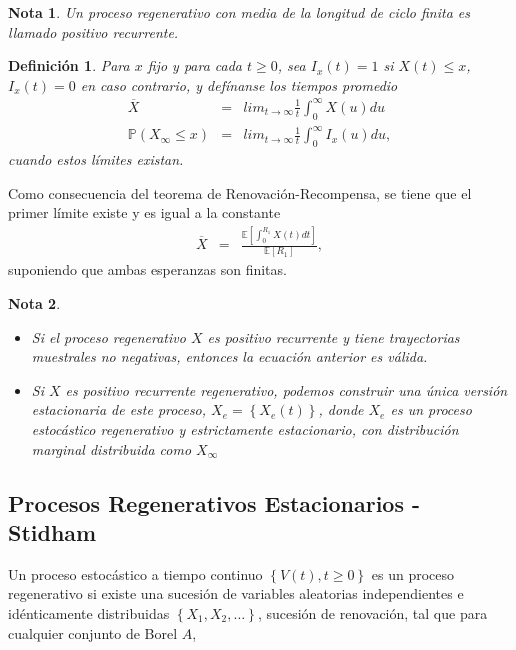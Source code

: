 \documentclass{article}
\newtheorem{Def}{Definición}
\newtheorem{Note}{Nota}
\newcommand{\esp}{\mathbb{E}}
\newcommand{\prob}{\mathbb{P}}
\begin{document}
\begin{Note}
Un proceso regenerativo con media de la longitud de ciclo finita es llamado positivo recurrente.
\end{Note}


\begin{Def}
Para $x$ fijo y para cada $t\geq0$, sea $I_{x}\left(t\right)=1$ si $X\left(t\right)\leq x$,  $I_{x}\left(t\right)=0$ en caso contrario, y def\'inanse los tiempos promedio
\begin{eqnarray*}
\overline{X}&=&lim_{t\rightarrow\infty}\frac{1}{t}\int_{0}^{\infty}X\left(u\right)du\\
\prob\left(X_{\infty}\leq x\right)&=&lim_{t\rightarrow\infty}\frac{1}{t}\int_{0}^{\infty}I_{x}\left(u\right)du,
\end{eqnarray*}
cuando estos l\'imites existan.
\end{Def}

Como consecuencia del teorema de Renovaci\'on-Recompensa, se tiene que el primer l\'imite  existe y es igual a la constante
\begin{eqnarray*}
\overline{X}&=&\frac{\esp\left[\int_{0}^{R_{1}}X\left(t\right)dt\right]}{\esp\left[R_{1}\right]},
\end{eqnarray*}
suponiendo que ambas esperanzas son finitas.

\begin{Note}
\begin{itemize}
\item[a)] Si el proceso regenerativo $X$ es positivo recurrente y tiene trayectorias muestrales no negativas, entonces la ecuaci\'on anterior es v\'alida.
\item[b)] Si $X$ es positivo recurrente regenerativo, podemos construir una \'unica versi\'on estacionaria de este proceso, $X_{e}=\left\{X_{e}\left(t\right)\right\}$, donde $X_{e}$ es un proceso estoc\'astico regenerativo y estrictamente estacionario, con distribuci\'on marginal distribuida como $X_{\infty}$
\end{itemize}
\end{Note}
\subsection{Procesos Regenerativos Estacionarios - Stidham \cite{Stidham}}


Un proceso estoc\'astico a tiempo continuo $\left\{V\left(t\right),t\geq0\right\}$ es un proceso regenerativo si existe una sucesi\'on de variables aleatorias independientes e id\'enticamente distribuidas $\left\{X_{1},X_{2},\ldots\right\}$, sucesi\'on de renovaci\'on, tal que para cualquier conjunto de Borel $A$, 
\end{document}
